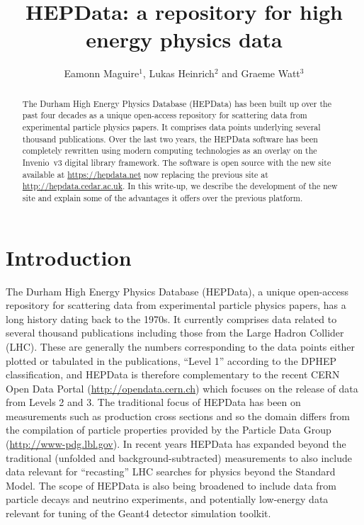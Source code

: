\documentclass[a4paper]{jpconf}
\begin{document}
\title{HEPData: a repository for high energy physics data}

\author{Eamonn Maguire$^1$, Lukas Heinrich$^2$ and Graeme Watt$^3$}
\address{$^1$ CERN, Geneva, Switzerland}
\address{$^2$ Department of Physics, New York University, New York, USA}
\address{$^3$ IPPP, Department of Physics, Durham University, Durham, UK}


\begin{abstract}
  The Durham High Energy Physics Database (HEPData) has been built up over the
past four decades as a unique open-access repository for scattering data from
experimental particle physics papers.  It comprises data points underlying
several thousand publications.  Over the last two years, the HEPData software
has been completely rewritten using modern computing technologies as an overlay
on the Invenio~v3 digital library framework.  The software is open source with
the new site available at \url{https://hepdata.net} now replacing the previous
site at \url{http://hepdata.cedar.ac.uk}.  In this write-up, we describe the
development of the new site and explain some of the advantages it offers over
the previous platform.
\end{abstract}

\section{Introduction}

The Durham High Energy Physics Database (HEPData), a unique open-access
repository for scattering data from experimental particle physics papers, has a
long history dating back to the 1970s.  It currently comprises data related to
several thousand publications including those from the Large Hadron Collider
(LHC).  These are generally the numbers corresponding to the data points
either plotted or tabulated in the publications, ``Level 1'' according to the
DPHEP~\cite{Mount:2009aa} classification, and HEPData is therefore
complementary to the recent CERN Open Data Portal
(\url{http://opendata.cern.ch}) which focuses on the release of data from
Levels 2 and 3.  The traditional focus of HEPData has been on measurements such
as production cross sections and so the domain differs from the compilation of
particle properties provided by the Particle Data Group
(\url{http://www-pdg.lbl.gov}).  In recent years HEPData has expanded beyond
the traditional (unfolded and background-subtracted) measurements to also
include data relevant for ``recasting'' LHC searches for physics beyond the
Standard Model.  The scope of HEPData is also being broadened to include
data from particle decays and neutrino experiments, and potentially low-energy
data relevant for tuning of the Geant4 detector simulation toolkit.
\end{document}
